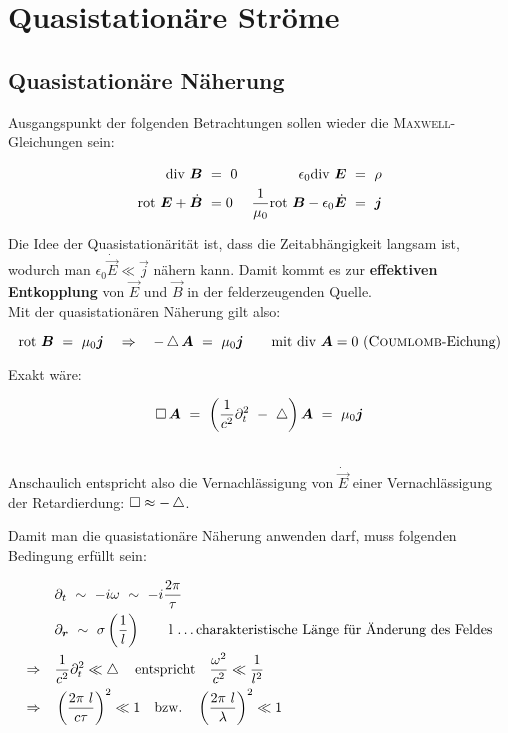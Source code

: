\chapter{Quasistationäre Ströme}

\section{Quasistationäre Näherung}

Ausgangspunkt der folgenden Betrachtungen sollen wieder die \textsc{Maxwell}-Gleichungen sein:

\begin{align*}
\div \vec{B} \ &= \ 0  &\epsilon_0\div\vec{E}  \ &= \ \rho\\
\rot\vec{E}+\dot{\vec{B}}  \ &= 0  &\frac{1}{\mu_0}\rot\vec{B}-\epsilon_0\dot{\vec{E}}  \ &= \ \vec{j}  
\end{align*}

Die Idee der Quasistationärität ist, dass die Zeitabhängigkeit langsam ist, wodurch man $\epsilon_0\dot{\vec{E}}\ll\vec{j}$ nähern kann. Damit kommt es zur \textbf{effektiven Entkopplung} von $\vec{E}$ und $\vec{B}$ in der felderzeugenden Quelle.\\
Mit der quasistationären Näherung gilt also:

\begin{equation*}
\text{rot }\bm{B} \ = \ \mu_0\bm{j} \quad\Rightarrow\quad -\mathop{{}\bigtriangleup}\nolimits\bm{A}  \ = \ \mu_0\bm{j} \qquad \text{mit $\text{div } \bm{A}=0$ (\textsc{Coumlomb}-Eichung)}
\end{equation*}

Exakt wäre:

\begin{equation*}
\mathop{{}\Box}\nolimits\bm{A}  \ = \  \left(\frac{1}{c^2}\partial^2_t \ - \ \mathop{{}\bigtriangleup}\nolimits\right)\bm{A}  \ = \  \mu_0\bm{j}
\end{equation*}

\ \\
Anschaulich entspricht also die Vernachlässigung von $\dot{\vec{E}}$ einer Vernachlässigung der Retardierdung: $\mathop{{}\Box}\nolimits \approx - \mathop{{}\bigtriangleup}\nolimits$.

\newpage
Damit man die quasistationäre Näherung anwenden darf, muss folgenden Bedingung erfüllt sein:

\begin{align*}
& \partial_t \ \sim \ -i\omega \ \sim \ -i\frac{2\pi}{\tau}\\
& \partial_{\bm{r}} \ \sim \ \sigma\left(\frac{1}{l}\right) \qquad \text{l \ldots charakteristische Länge für Änderung des Feldes}\\
\Rightarrow \quad & \frac{1}{c^2}\partial_t^2\ll\mathop{{}\bigtriangleup}\nolimits \quad \text{entspricht} \quad \frac{\omega^2}{c^2}\ll\frac{1}{l^2}\\
\Rightarrow \quad &\left(\frac{2\pi \ l}{c\tau}\right)^2\ll 1 \quad\text{bzw.}\quad\left(\frac{2\pi \ l}{\lambda}\right)^2\ll 1
\end{align*}


